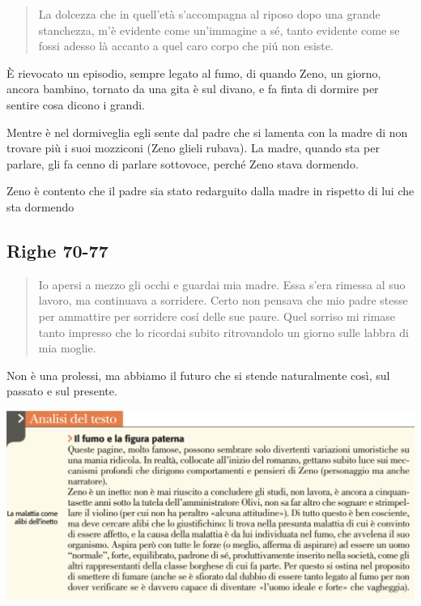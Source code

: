\documentclass[a4paper, twoside, titlepage]{book}
\begin{document}
\begin{quotation}
 La dolcezza che in quell’età s’accompagna al riposo dopo una grande stanchezza, m’è evidente come un’immagine a sé, tanto evidente come se fossi adesso là accanto a quel caro corpo che piú non esiste.
\end{quotation}

È rievocato un episodio, sempre legato al fumo, di quando Zeno, un giorno, ancora bambino, tornato da una gita è sul divano, e fa finta di dormire per sentire cosa dicono i grandi.

Mentre è nel dormiveglia egli sente dal padre che si lamenta con la madre di non trovare più i suoi mozziconi (Zeno glieli rubava). La madre, quando sta per parlare, gli fa cenno di parlare sottovoce, perché Zeno stava dormendo.

Zeno è contento che il padre sia stato redarguito dalla madre in rispetto di lui che sta dormendo

\subsection*{Righe 70-77}

\begin{quotation}
Io apersi a mezzo gli occhi e guardai mia madre. Essa s’era rimessa al suo lavoro, ma continuava a sorridere. Certo non pensava che mio padre stesse per ammattire per sorridere cosí delle sue paure. Quel sorriso mi rimase tanto impresso che lo ricordai subito ritrovandolo un giorno sulle labbra di mia moglie.
\end{quotation}

Non è una prolessi, ma abbiamo il futuro che si stende naturalmente così, sul passato e sul presente.

\begin{center}
\includegraphics[width=\textwidth]{fumo1}
\end{center}
\end{document}
